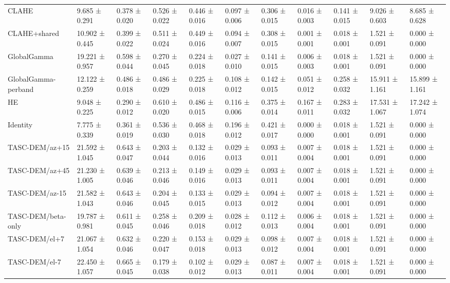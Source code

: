 \begin{table}[t]
\begin{tabular}{lllllllllll}
CLAHE & 9.685 ± 0.291 & 0.378 ± 0.020 & 0.526 ± 0.022 & 0.446 ± 0.016 & 0.097 ± 0.006 & 0.306 ± 0.015 & 0.016 ± 0.003 & 0.141 ± 0.015 & 9.026 ± 0.603 & 8.685 ± 0.628 \\
CLAHE+shared & 10.902 ± 0.445 & 0.399 ± 0.022 & 0.511 ± 0.024 & 0.449 ± 0.016 & 0.094 ± 0.007 & 0.308 ± 0.015 & 0.001 ± 0.001 & 0.018 ± 0.001 & 1.521 ± 0.091 & 0.000 ± 0.000 \\
GlobalGamma & 19.221 ± 0.957 & 0.598 ± 0.044 & 0.270 ± 0.045 & 0.224 ± 0.018 & 0.027 ± 0.010 & 0.141 ± 0.015 & 0.006 ± 0.003 & 0.018 ± 0.001 & 1.521 ± 0.091 & 0.000 ± 0.000 \\
GlobalGamma-perband & 12.122 ± 0.259 & 0.486 ± 0.018 & 0.486 ± 0.029 & 0.225 ± 0.018 & 0.108 ± 0.012 & 0.142 ± 0.015 & 0.051 ± 0.012 & 0.258 ± 0.032 & 15.911 ± 1.161 & 15.899 ± 1.161 \\
HE & 9.048 ± 0.225 & 0.290 ± 0.012 & 0.610 ± 0.020 & 0.486 ± 0.015 & 0.116 ± 0.006 & 0.375 ± 0.014 & 0.167 ± 0.011 & 0.283 ± 0.032 & 17.531 ± 1.067 & 17.242 ± 1.074 \\
Identity & 7.775 ± 0.339 & 0.361 ± 0.019 & 0.536 ± 0.030 & 0.468 ± 0.018 & 0.196 ± 0.012 & 0.421 ± 0.017 & 0.000 ± 0.000 & 0.018 ± 0.001 & 1.521 ± 0.091 & 0.000 ± 0.000 \\
TASC-DEM/az+15 & 21.592 ± 1.045 & 0.643 ± 0.047 & 0.203 ± 0.044 & 0.132 ± 0.016 & 0.029 ± 0.013 & 0.093 ± 0.011 & 0.007 ± 0.004 & 0.018 ± 0.001 & 1.521 ± 0.091 & 0.000 ± 0.000 \\
TASC-DEM/az+45 & 21.230 ± 1.005 & 0.639 ± 0.046 & 0.213 ± 0.046 & 0.149 ± 0.016 & 0.029 ± 0.013 & 0.093 ± 0.011 & 0.007 ± 0.004 & 0.018 ± 0.001 & 1.521 ± 0.091 & 0.000 ± 0.000 \\
TASC-DEM/az-15 & 21.582 ± 1.043 & 0.643 ± 0.046 & 0.204 ± 0.045 & 0.133 ± 0.015 & 0.029 ± 0.013 & 0.094 ± 0.012 & 0.007 ± 0.004 & 0.018 ± 0.001 & 1.521 ± 0.091 & 0.000 ± 0.000 \\
TASC-DEM/beta-only & 19.787 ± 0.981 & 0.611 ± 0.045 & 0.258 ± 0.046 & 0.209 ± 0.018 & 0.028 ± 0.012 & 0.112 ± 0.013 & 0.006 ± 0.004 & 0.018 ± 0.001 & 1.521 ± 0.091 & 0.000 ± 0.000 \\
TASC-DEM/el+7 & 21.067 ± 1.054 & 0.632 ± 0.046 & 0.220 ± 0.047 & 0.153 ± 0.018 & 0.029 ± 0.013 & 0.098 ± 0.012 & 0.007 ± 0.004 & 0.018 ± 0.001 & 1.521 ± 0.091 & 0.000 ± 0.000 \\
TASC-DEM/el-7 & 22.450 ± 1.057 & 0.665 ± 0.045 & 0.179 ± 0.038 & 0.102 ± 0.012 & 0.029 ± 0.013 & 0.087 ± 0.011 & 0.007 ± 0.004 & 0.018 ± 0.001 & 1.521 ± 0.091 & 0.000 ± 0.000 \\

\end{tabular}
\end{table}
